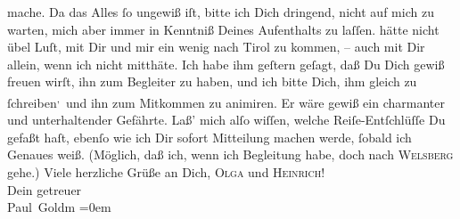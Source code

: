 \begin{ledgroupsized}[t]{13cm}
               mache. Da das Alles ſo ungewiß iſt, bitte ich Dich dringend, nicht auf mich zu
               warten, mich aber immer in Kenntniß Deines Aufenthalts {\pb}zu laſſen.\pend
           \pstart
           \label{K_L03379-4v}\label{K_L03379-4h} hätte nicht übel
               Luſt, mit Dir und mir ein wenig nach Tirol zu kommen, – auch mit Dir allein, wenn ich nicht mitthäte. Ich habe
               ihm geſtern geſagt, daß Du Dich gewiß freuen wirſt,
               ihn zum Begleiter zu haben, und ich bitte Dich, ihm gleich zu ſchreiben\substVorne{}\textsuperscript{,}\substDazwischen{} und\substHinten{} ihn zum Mitkommen zu animiren. Er wäre gewiß ein charmanter und
               unterhaltender Gefährte.\pend
           \pstart
           Laß’ mich alſo wiſſen, {\pb}welche Reiſe-Entſchlüſſe Du
               gefaßt haſt, ebenſo wie ich Dir sofort Mitteilung machen werde, ſobald ich Genaues
               weiß. (Möglich, daß ich, wenn ich Begleitung habe, doch nach \textsc{Welsberg} gehe.)\pend
           \pstart
           Viele herzliche Grüße an Dich, \textsc{Olga} und \textsc{Heinrich}! {\\[\baselineskip]}Dein getreuer {\\[\baselineskip]}\spacefill\mbox{Paul Goldm}\pend
           \leftskip=0em{}
         
         \endnumbering{}\end{ledgroupsized}  \newcommand{\dateiname}{L03379}\newcommand{\titel}{Paul Goldmann an Arthur Schnitzler, 31. 7. [1903]}\newcommand{\editorInnen}{Martin Anton Müller und Laura Untner}
      